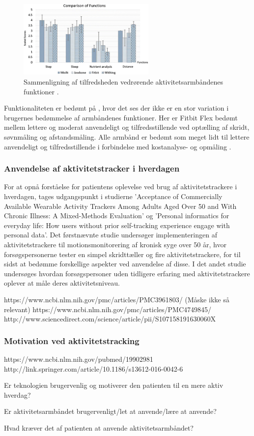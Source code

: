 \begin{figure}[H]
	\centering
	\includegraphics[width=0.6\textwidth]{figures/FunctionSatisfaction}
	\caption{Sammenligning af tilfredsheden vedrørende aktivitetsarmbåndenes funktioner \citep{kaewkannate2016}.}
	\label{fig:FunctionSatisfaction}
\end{figure}

Funktionaliteten er bedømt på , hvor det ses der ikke er en stor variation i brugernes bedømmelse af armbåndenes funktioner. Her er Fitbit Flex bedømt mellem lettere og moderat anvendeligt og tilfredsstillende ved optælling af skridt, søvnmåling og afstandsmåling. Alle armbånd er bedømt som meget lidt til lettere anvendeligt og tilfredsstillende i forbindelse med kostanalyse- og opmåling \citep{kaewkannate2016}.

\subsubsection{Anvendelse af aktivitetstracker i hverdagen}

For at opnå forståelse for patientens oplevelse ved brug af aktivitetstrackere i hverdagen, tages udgangspunkt i studierne 'Acceptance of Commercially Available Wearable Activity Trackers Among Adults Aged Over 50 and With Chronic Illness: A Mixed-Methods Evaluation' og 'Personal informatics for everyday life: How users without prior self-tracking experience engage with personal data'. Det førstnævnte studie undersøger implementeringen af aktivitetstrackere til motionsmonitorering af kronisk syge over 50 år, hvor forsøgspersonerne tester en simpel skridttæller og fire aktivitetstrackere, for til sidst at bedømme forskellige aspekter ved anvendelse af disse. I det andet studie undersøges hvordan forsøgspersoner uden tidligere erfaring med aktivitetstrackere oplever at måle deres aktivitetsniveau.


https://www.ncbi.nlm.nih.gov/pmc/articles/PMC3961803/ (Måske ikke så relevant)
https://www.ncbi.nlm.nih.gov/pmc/articles/PMC4749845/
http://www.sciencedirect.com/science/article/pii/S107158191630060X


\subsubsection{Motivation ved aktivitetstracking}

https://www.ncbi.nlm.nih.gov/pubmed/19902981
http://link.springer.com/article/10.1186/s13612-016-0042-6


Er teknologien brugervenlig og motiverer den patienten til en mere aktiv hverdag?

Er aktivitetsarmbåndet brugervenligt/let at anvende/lære at anvende?

Hvad kræver det af patienten at anvende aktivitetsarmbåndet?